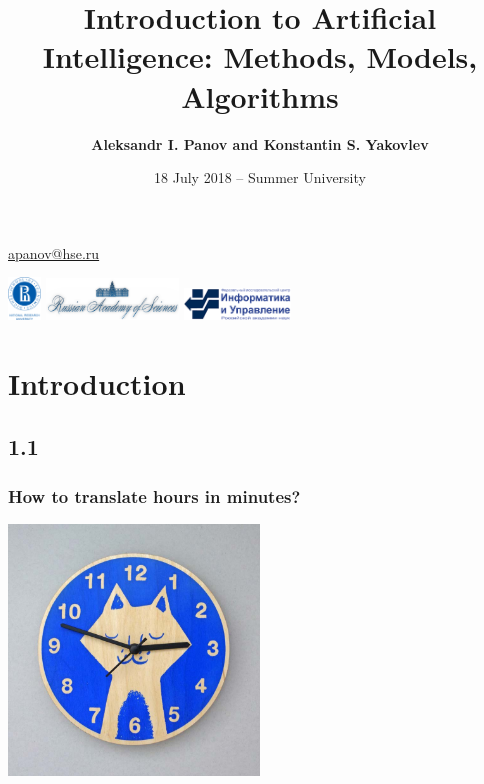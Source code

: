 \documentclass[default]{beamer}
\begin{document}
	
	\title[Introduction to AI]{Introduction to Artificial Intelligence: Methods, Models, Algorithms}
	\author[Panov]{\textbf{Aleksandr I. Panov and Konstantin S. Yakovlev}}
	\date{18 July 2018 -- Summer University} 
	
	{
	\begin{frame}
		
		\titlepage
		\centering
		\href{mailto:apanov@hse.ru}{apanov@hse.ru}
		
		\includegraphics[width=25pt]{hse.png} \hspace{10pt}
		\includegraphics[width=100pt]{ras_en.png} \hspace{10pt}
		\includegraphics[width=80pt]{frccsc.png}
		
	\end{frame}
	}	

	\section{Introduction}
	\subsection{1.1}
	\begin{frame}
		\frametitle{How to translate hours in minutes?}

		\centering
		\includegraphics[width=0.5\textwidth]{intro1.jpg}
	\end{frame}
\end{document}
